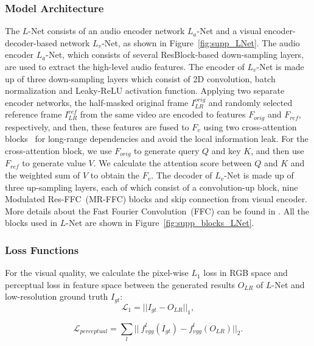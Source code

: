 \subsubsection{Model Architecture}
The $L$-Net consists of an audio encoder network $L_a$-Net and a visual encoder-decoder-based network $L_v$-Net, as shown in Figure~\ref{fig:supp_LNet}.
The audio encoder $L_a$-Net, which consists of several ResBlock-based down-sampling layers, are used to extract the high-level audio features. The encoder of $L_v$-Net is made up of three down-sampling layers which consist of 2D convolution, batch normalization and Leaky-ReLU activation function. Applying two separate encoder networks, the half-masked original frame $I_{LR}^{orig}$ and randomly selected reference frame $I_{LR}^{ref}$ from the same video are encoded to features $F_{orig}$ and $F_{ref}$, respectively, and then, these features are fused to $F_v$ using two cross-attention blocks~\cite{transformer} for long-range dependencies and avoid the local information leak. For the cross-attention block, we use $F_{orig}$ to generate query $Q$ and key $K$, and then use $F_{ref}$ to generate value $V$. We calculate the attention score between $Q$ and $K$ and the weighted sum of $V$ to obtain the $F_v$. 
The decoder of $L_v$-Net is made up of three up-sampling layers, each of which consist of a convolution-up block, nine Modulated Res-FFC~(MR-FFC) blocks and skip connection from visual encoder. More details about the Fast Fourier Convolution~(FFC) can be found in \cite{ffc}. All the blocks used in $L$-Net are shown in Figure~\ref{fig:supp_blocks_LNet}.


\subsubsection{Loss Functions} 
For the visual quality, we calculate the pixel-wise $L_1$ loss in RGB space and perceptual loss in feature space between the generated results $O_{LR}$ of $L$-Net and low-resolution ground truth $I_{gt}$:
\begin{equation}
\mathcal{L}_1 = \vert\vert I_{gt}-O_{LR}\vert\vert_1,
\end{equation}

\begin{equation}
\mathcal{L}_{perceptual} = \sum_l \vert\vert\ f_{vgg}^l(I_{gt}) - f_{vgg}^l(O_{LR})\vert\vert_2.
\end{equation}

